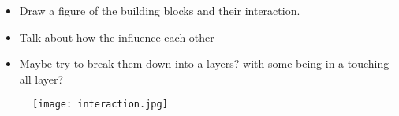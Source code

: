 \begin{itemize}
	\item Draw a figure of the building blocks and their interaction. 
	\item Talk about how the influence each other
	\item Maybe try to break them down into a layers? with some being in a touching-all layer?
\end{itemize}


%

\begin{figure}[h]
	\centering
	\texttt{[image: interaction.jpg]}
	\caption{}
	\label{fig:tree-cpVScl}
\end{figure}


